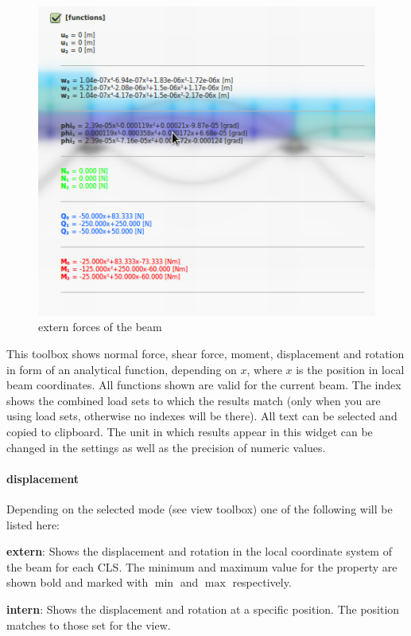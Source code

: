 \documentclass[a4paper,11pt]{report}
\begin{document}
\begin{minipage}[h]{0.5\textwidth-0.5cm}
\begin{figure}[H]
\begin{center}
\includegraphics[width=\textwidth]{../pictures/functionsextended.png}
\caption{extern forces of the beam}
\label{pic:externforces}
\end{center}
\end{figure}
\end{minipage}
\hspace{1cm}
\begin{minipage}[h]{0.5\textwidth-0.5cm}
This toolbox shows normal force, shear force, moment, displacement and rotation in form of an analytical function, depending on $x$, where $x$ is the position in local beam coordinates. All functions shown are valid for the current beam. The index shows the combined load sets to which the results match (only when you are using load sets, otherwise no indexes will be there). All text can be selected and copied to clipboard. The unit in which results appear in this widget can be changed in the settings as well as the precision of numeric values.
\end{minipage}




\paragraph{displacement}
Depending on the selected mode (see view toolbox) one of the following will be listed here:
\begin{trivlist}
\leftskip=1cm
\item[] \textbf{extern}: Shows the displacement and rotation in the local coordinate system of the beam for each CLS. The minimum and maximum value for the property are shown bold and marked with $\min$ and $\max$ respectively.
\item[] \textbf{intern}: Shows the displacement and rotation at a specific position. The position matches to those set for the view.
\end{trivlist}
\end{document}
